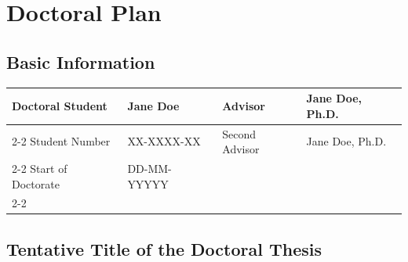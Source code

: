 \documentclass[11pt]{article}
\begin{document}
\thispagestyle{firstpage}

\setlength{\headheight}{1 \baselineskip}  %
\setlength{\parindent}{0pt}  %
\setlength{\parskip}{\baselineskip}  %

\vspace*{-5px}
\section*{Doctoral Plan}

\subsection*{Basic Information}


\begin{table}[h!]
\begin{tabular}{llll}
Doctoral Student   & Jane Doe & Advisor        & Jane Doe, Ph.D. \\ \cline{2-2} \cline{4-4} 
Student Number     & XX-XXXX-XX & Second Advisor & Jane Doe, Ph.D. \\ \cline{2-2} \cline{4-4} 
Start of Doctorate & DD-MM-YYYYY &                &  \\ \cline{2-2}
\end{tabular}
\end{table}


\subsection*{Tentative Title of the Doctoral Thesis}

%
\end{document}
